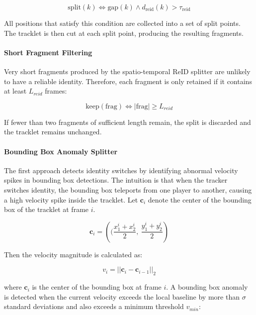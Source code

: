 \begin{equation}
    \text{split}(k) \iff \text{gap}(k) \land d_\text{reid} (k) > \tau_\text{reid}
\end{equation}

All positions that satisfy this condition are collected into a set of split points. The tracklet is then cut at each split point, producing the resulting fragments.

\paragraph{Short Fragment Filtering}
Very short fragments produced by the spatio-temporal ReID splitter are unlikely to have a reliable identity. Therefore, each fragment is only retained if it contains at least $L_{reid}$ frames:

\begin{equation}
    \text{keep}(\text{frag}) \iff |\text{frag}| \geq L_{reid}
\end{equation}

If fewer than two fragments of sufficient length remain, the split is discarded and the tracklet remains unchanged.



\paragraph{Bounding Box Anomaly Splitter}\label{bbox_anomaly_splitter}
The first approach detects identity switches by identifying abnormal velocity spikes in bounding box detections. The intuition is that when the tracker switches identity, the bounding box teleports from one player to another, causing a high velocity spike inside the tracklet. Let $\textbf{c}_i$ denote the center of the bounding box of the tracklet at frame $i$.

\begin{equation}
    \textbf{c}_i = \left( (\frac{x_1^i + x_2^i}{2},\ \frac{y_1^i + y_2^i}{2}\right)
\end{equation}

Then the velocity magnitude is calculated as:

\begin{equation}
    v_i=||\mathbf{c}_i - \mathbf{c}_{i-1}||_2
\end{equation}

where $\textbf{c}_i$ is the center of the bounding box at frame $i$. A bounding box anomaly is detected when the current velocity exceeds the local baseline by more than $\sigma$ standard deviations and also exceeds a minimum threshold $v_{min}$:

